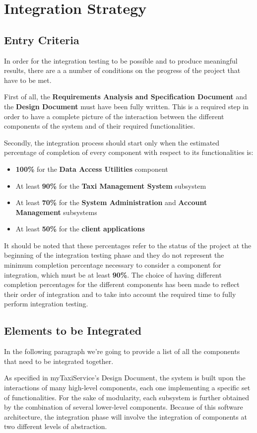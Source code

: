 \chapter{Integration Strategy}
\section{Entry Criteria}
In order for the integration testing to be possible and to produce meaningful results, there are a a number of conditions on the progress of the project that have to be met.

First of all, the \textbf{Requirements Analysis and Specification Document} and the \textbf{Design Document} must have been fully written. This is a required step in order to have a complete picture of the interaction between the different components of the system and of their required functionalities. 

Secondly, the integration process should start only when the estimated percentage of completion of every component with respect to its functionalities is:
\begin{itemize}
	\item \textbf{100\%} for the \textbf{Data Access Utilities} component
	\item At least \textbf{90\%} for the \textbf{Taxi Management System} subsystem
	\item At least \textbf{70\%} for the \textbf{System Administration} and \textbf{Account Management} subsystems
	\item At least \textbf{50\%} for the \textbf{client applications}
\end{itemize} 
It should be noted that these percentages refer to the status of the project at the beginning of the integration testing phase and they do not represent the minimum completion percentage necessary to consider a component for integration, which must be at least \textbf{90\%}. The choice of having different completion percentages for the different components has been made to reflect their order of integration and to take into account the required time to fully perform integration testing.

\section{Elements to be Integrated}
In the following paragraph we're going to provide a list of all the components that need to be integrated together.

As specified in myTaxiService's Design Document, the system is built upon the interactions of many high-level components, each one implementing a specific set of functionalities. For the sake of modularity, each subsystem is further obtained by the combination of several lower-level components.
Because of this software architecture, the integration phase will involve the integration of components at two different levels of abstraction. 


